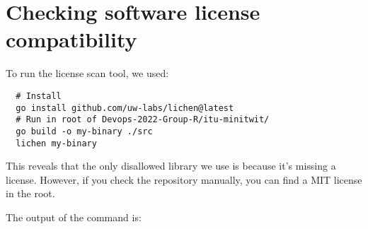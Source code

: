 \section{Checking software license compatibility}
\label{appendix:software-license-check}
To run the license scan tool, we used:
\begin{verbatim}
  # Install
  go install github.com/uw-labs/lichen@latest
  # Run in root of Devops-2022-Group-R/itu-minitwit/
  go build -o my-binary ./src
  lichen my-binary
\end{verbatim}
This reveals that the only disallowed library we use is  because it's missing a license. However, if you check the repository manually, you can find a MIT license in the root.

The output of the command is:
\bgroup
\small
